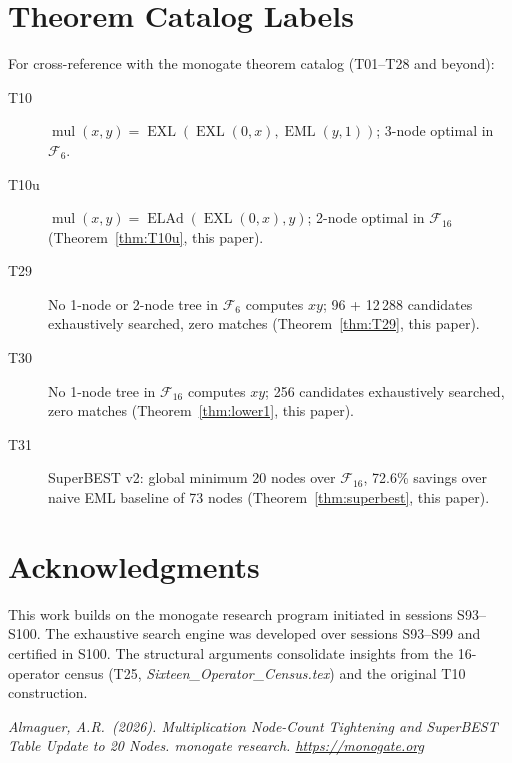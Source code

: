 \documentclass[12pt,a4paper]{article}
\theoremstyle{definition}
\newcommand{\EML}{\operatorname{EML}}
\newcommand{\EXL}{\operatorname{EXL}}
\newcommand{\ELAd}{\operatorname{ELAd}}
\newcommand{\mul}{\operatorname{mul}}
\begin{document}
\section*{Theorem Catalog Labels}

For cross-reference with the monogate theorem catalog (T01--T28 and beyond):

\begin{description}
  \item[T10]  $\mul(x,y)=\EXL(\EXL(0,x),\EML(y,1))$; 3-node optimal in $\mathcal{F}_6$.
  \item[T10u] $\mul(x,y)=\ELAd(\EXL(0,x),y)$; 2-node optimal in $\mathcal{F}_{16}$
              (Theorem~\ref{thm:T10u}, this paper).
  \item[T29]  No 1-node or 2-node tree in $\mathcal{F}_6$ computes $xy$;
              96 + 12\,288 candidates exhaustively searched, zero matches
              (Theorem~\ref{thm:T29}, this paper).
  \item[T30]  No 1-node tree in $\mathcal{F}_{16}$ computes $xy$; 256 candidates
              exhaustively searched, zero matches (Theorem~\ref{thm:lower1}, this paper).
  \item[T31]  SuperBEST v2: global minimum 20 nodes over $\mathcal{F}_{16}$,
              72.6\% savings over naive EML baseline of 73 nodes
              (Theorem~\ref{thm:superbest}, this paper).
\end{description}

\section*{Acknowledgments}

This work builds on the monogate research program initiated in sessions
S93--S100.  The exhaustive search engine was developed over sessions S93--S99
and certified in S100.  The structural arguments consolidate insights from
the 16-operator census (T25, \textit{Sixteen\_Operator\_Census.tex}) and
the original T10 construction.

\bigskip
\noindent\textit{Almaguer, A.R.\ (2026).
Multiplication Node-Count Tightening and SuperBEST Table Update to 20 Nodes.
monogate research. \url{https://monogate.org}}
\end{document}
